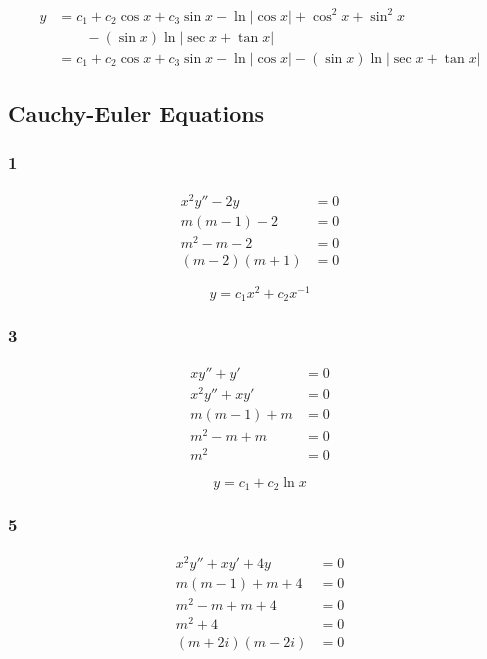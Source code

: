 \documentclass{article}
\begin{document}
\begin{align*}
  y & = c_1 + c_2 \cos x + c_3 \sin x - \ln |\cos x| + \cos^2 x + \sin^2 x            \\
    & \qquad - (\sin x) \ln |\sec x + \tan x|                                         \\
    & = c_1 + c_2 \cos x + c_3 \sin x - \ln |\cos x| - (\sin x) \ln |\sec x + \tan x|
\end{align*}

\subsection{Cauchy-Euler Equations}

\subsubsection{1}

\begin{align*}
  x^2 y'' - 2y    & = 0 \\
  m (m - 1) - 2   & = 0 \\
  m^2 - m - 2     & = 0 \\
  (m - 2) (m + 1) & = 0
\end{align*}

\[y = c_1 x^2 + c_2 x^{-1}\]

\subsubsection{3}

\begin{align*}
  x y'' + y'     & = 0 \\
  x^2 y'' + x y' & = 0 \\
  m (m - 1) + m  & = 0 \\
  m^2 - m + m    & = 0 \\
  m^2            & = 0
\end{align*}

\[y = c_1 + c_2 \ln x\]

\subsubsection{5}

\begin{align*}
  x^2 y'' + x y' + 4y & = 0 \\
  m (m - 1) + m + 4   & = 0 \\
  m^2 - m + m + 4     & = 0 \\
  m^2 + 4             & = 0 \\
  (m + 2i) (m - 2i)   & = 0
\end{align*}
\end{document}
